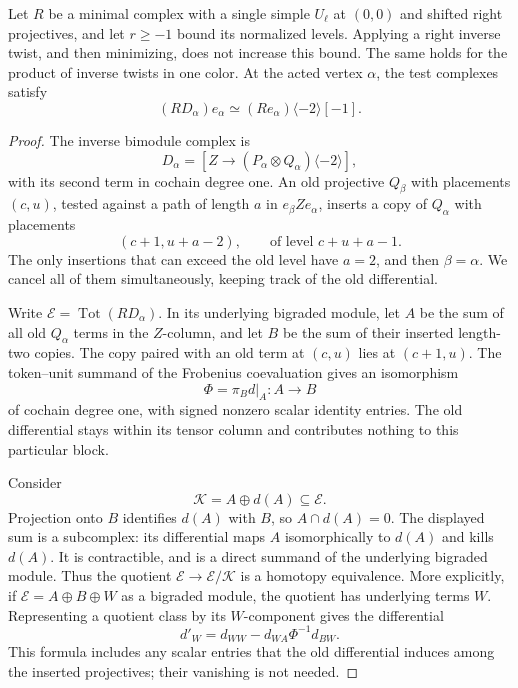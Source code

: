 \begin{lemma}
\label{lem:two-point-negative-bound}
Let \(R\) be a minimal complex with a single simple \(U_\ell\) at
\((0,0)\) and shifted right projectives, and let \(r\ge-1\) bound its
normalized levels.  Applying a right inverse twist, and then
minimizing, does not increase this bound.  The same holds for the
product of inverse twists in one color.  At the acted vertex
\(\alpha\), the test complexes satisfy
\begin{equation}
\label{eq:two-point-inverse-test}
 (R D_\alpha)e_\alpha
       \simeq (Re_\alpha)\langle-2\rangle[-1].
\end{equation}
\end{lemma}

\begin{proof}
The inverse bimodule complex is
\[
 D_\alpha=
 [Z\longrightarrow(P_\alpha\otimes Q_\alpha)\langle-2\rangle],
\]
with its second term in cochain degree one.  An old projective
\(Q_\beta\) with placements \((c,u)\), tested against a path of
length \(a\) in \(e_\beta Ze_\alpha\), inserts a copy of
\(Q_\alpha\) with placements
\begin{equation}
\label{eq:two-point-inserted-placements}
 (c+1,u+a-2),
 \qquad\text{of level }c+u+a-1.
\end{equation}
The only insertions that can exceed the old level have \(a=2\), and
then \(\beta=\alpha\).  We cancel all of them simultaneously, keeping
track of the old differential.

Write \(\mathcal E=\operatorname{Tot}(R D_\alpha)\).  In its underlying
bigraded module, let \(A\) be the sum of all old \(Q_\alpha\) terms
in the \(Z\)-column, and let \(B\) be the sum of their inserted
length-two copies.  The copy paired with an old term at \((c,u)\)
lies at \((c+1,u)\).  The token--unit summand of the Frobenius
coevaluation gives an isomorphism
\[
 \Phi=\pi_B d|_A:A\longrightarrow B
\]
of cochain degree one, with signed nonzero scalar identity entries.
The old differential stays within its tensor column and contributes
nothing to this particular block.

Consider
\[
 \mathcal K=A\oplus d(A)\subseteq\mathcal E.
\]
Projection onto \(B\) identifies \(d(A)\) with \(B\), so
\(A\cap d(A)=0\).  The displayed sum is a subcomplex: its
differential maps \(A\) isomorphically to \(d(A)\) and kills
\(d(A)\).  It is contractible, and is a direct summand of the
underlying bigraded module.  Thus the quotient
\(\mathcal E\longrightarrow\mathcal E/\mathcal K\) is a homotopy
equivalence.  More explicitly, if
\(\mathcal E=A\oplus B\oplus W\) as a bigraded module, the quotient
has underlying terms \(W\).  Representing a quotient class by its
\(W\)-component gives the differential
\begin{equation}
\label{eq:two-point-pivot-differential}
 d'_W=d_{WW}-d_{WA}\Phi^{-1}d_{BW}.
\end{equation}
This formula includes any scalar entries that the old differential
induces among the inserted projectives; their vanishing is not
needed.


\end{proof}
